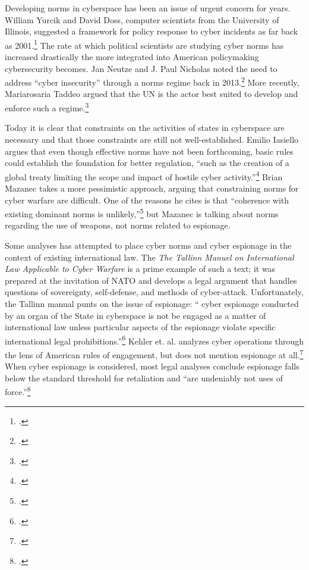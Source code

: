 \documentclass{memoir}
\begin{document}
\begin{refsegment}
Developing norms in cyberspace has been an issue of urgent concern for years. William Yurcik and David Doss, computer scientists from the University of Illinois, suggested a framework for policy response to cyber incidents as far back as 2001.\footcite{yurcik_internet_2001} The rate at which political scientists are studying cyber norms has increased drastically the more integrated into American policymaking cybersecurity becomes. Jan Neutze and J. Paul Nicholas noted the need to address ``cyber insecurity'' through a norms regime back in 2013.\footcite{neutze_cyber_2013} More recently, Mariarosaria Taddeo argued that the UN is the actor best suited to develop and enforce such a regime.\footcite{taddeo_deterrence_2017}

Today it is clear that constraints on the activities of states in cyberspace are necessary and that those constraints are still not well-established. Emilio Iasiello argues that even though effective norms have not been forthcoming, basic rules could establish the foundation for better regulation, ``such as the creation of a global treaty limiting the scope and impact of hostile cyber activity.''\footcite[p.~35]{iasiello_what_2016} Brian Mazanec takes a more pessimistic approach, arguing that constraining norms for cyber warfare are difficult. One of the reasons he cites is that ``coherence with existing dominant norms is unlikely,''\footcite[p.~104-105]{mazanec_constraining_2016} but Mazanec is talking about norms regarding the use of weapons, not norms related to espionage.

Some analyses has attempted to place cyber norms and cyber espionage in the context of existing international law. The \emph{The Tallinn Manuel on International Law Applicable to Cyber Warfare} is a prime example of such a text; it was prepared at the invitation of NATO and develops a legal argument that handles questions of sovereignty, self-defense, and methods of cyber-attack. Unfortunately, the Tallinn manual punts on the issue of espionage: ``\textelp{} cyber espionage conducted by an organ of the State in cyberspace is not be engaged as a matter of international law unless particular aspects of the espionage violate specific international legal prohibitions.''\footcite[p.~36]{schmitt_tallinn_2013} Kehler et. al. analyzes cyber operations through the lens of American rules of engagement, but does not mention espionage at all.\footcite{kehler_rules_2017} When cyber espionage is considered, most legal analyses conclude espionage falls below the standard threshold for retaliation and ``are undeniably not uses of force.''\footcite[p.~255]{caso_rules_2014}


\end{refsegment}
\end{document}
